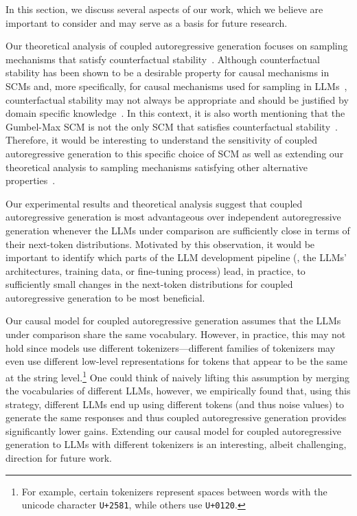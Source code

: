 In this section, we discuss several aspects of our work, which we believe are important to consider and may serve as a basis for future research. 

%
Our theoretical analysis of coupled autoregressive generation focuses on sampling mechanisms that satisfy counterfactual stability~\citep{oberst2019counterfactual}. Although counterfactual stability has been shown to be a desirable property for causal mechanisms in SCMs and, more specifically, for causal mechanisms used for sampling in LLMs~\citep{chatzi2024counterfactual}, counterfactual stability may not always be appropriate and should be justified by domain specific knowledge~\citep{haugh2023counterfactual}. 
%
In this context, it is also worth mentioning that the Gumbel-Max SCM is not the only SCM that satisfies counterfactual stability~\citep{lorberbom2021learning,haugh2023counterfactual}. Therefore, it would be interesting to understand the sensitivity of coupled autoregressive generation to this specific choice of SCM as well as extending our theoretical analysis to sampling mechanisms satisfying other alternative properties~\citep{vlontzos2023estimating}. 

Our experimental results and theoretical analysis suggest that coupled autoregressive generation is most advantageous over independent autoregressive generation whenever the LLMs under comparison are sufficiently close in terms of their next-token distributions.
%
Motivated by this observation, it would be important to identify which parts of the LLM development pipeline (\eg, the LLMs' architectures, training data, or fine-tuning process) lead, in practice, to sufficiently small changes in the next-token distributions for coupled autoregressive generation to be most beneficial.

Our causal model for coupled autoregressive generation assumes that the LLMs under comparison share the same vocabulary. However, in practice, this may not hold since models use different tokenizers---different families of tokenizers may even use different low-level representations for tokens that appear to be the same at the string level.\footnote{For example, certain tokenizers represent spaces between words with the unicode character \texttt{U+2581}, while others use \texttt{U+0120}.} 
%
One could think of naively lifting this assumption by merging the vocabularies of different LLMs, however, we empirically found that, using this strategy, different LLMs end up using different tokens (and thus noise values) to generate the same responses and thus coupled autoregressive generation provides significantly lower gains.
%
Extending our causal model for coupled autoregressive generation to LLMs with different tokenizers is an interesting, albeit challenging, direction for future work.


